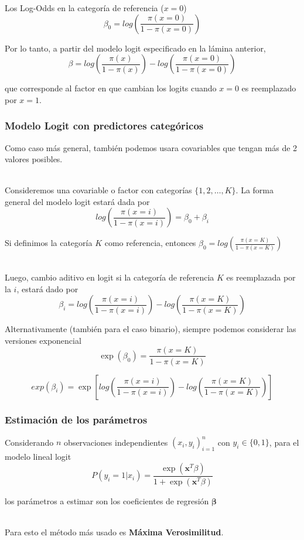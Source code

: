 \documentclass[]{beamer}
\begin{document}
\begin{frame}
    \frametitle{}
    Los Log-Odds en la categoría de referencia ($x=0$)
    $$\beta_0=log\left( \frac{\pi(x=0)}{1-\pi(x=0)}\right)$$

    Por lo tanto, a partir del modelo logit especificado en la lámina anterior,
    $$\beta = log\left( \frac{\pi(x)}{1-\pi(x)}\right) - log\left( \frac{\pi(x=0)}{1-\pi(x=0)}\right)$$
    
    que corresponde al factor en que cambian los logits cuando $x=0$ es reemplazado por $x=1$.
\end{frame}

\begin{frame}
    \frametitle{Modelo Logit con predictores categóricos}

    Como caso más general, también podemos usara covariables que tengan más de 2 valores posibles.\\~\   

    Consideremos una covariable o factor con categorías $\{1,2,\ldots ,  K\}$. La forma general del 
    modelo logit estará dada por 
    $$log\left(\frac{\pi(x=i)}{1-\pi(x=i)}\right)=\beta_0+\beta_i$$

    Si definimos la categoría $K$ como referencia, entonces $\beta_0 =log \left(\frac{\pi(x=K)}{1-\pi(x=K)}\right)$\\~\ 

\end{frame}

\begin{frame}
    Luego, cambio aditivo en logit si la categoría de referencia $K$ es reemplazada por la $i$, estará dado por 
    $$\beta_i=log\left( \frac{\pi(x=i)}{1-\pi(x=i)}\right) - log\left( \frac{\pi(x=K)}{1-\pi(x=K)}\right)$$

    Alternativamente (también para el caso binario), siempre podemos considerar las versiones exponencial 
    $$\exp(\beta_0)=\frac{\pi(x=K)}{1-\pi(x=K)}$$

    $$exp(\beta_i)=\exp\left[log\left( \frac{\pi(x=i)}{1-\pi(x=i)}\right) - log\left( \frac{\pi(x=K)}{1-\pi(x=K)}\right)\right]$$


\end{frame}

\begin{frame}
    \frametitle{Estimación de los parámetros}

    Considerando $n$ observaciones independientes $(x_i,y_i)_{i=1}^{n}$ con $y_i\in\{0,1\}$, para el modelo lineal logit 
     $$P(y_i=1|x_i)=\frac{\exp(\mathbf{x}^T\beta )}{1+\exp(\mathbf{x}^T\beta )}$$

    los parámetros a estimar son los coeficientes de regresión $\mathbf{\beta}$\\~\  

    Para esto el método más usado es \textbf{Máxima Verosimilitud}. 

\end{frame}
\end{document}

